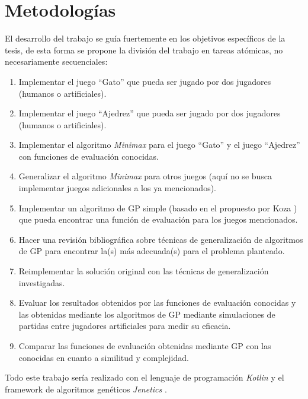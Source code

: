 \section{Metodologías}
  El desarrollo del trabajo se guía fuertemente en los objetivos específicos de la tesis, de esta 
  forma se propone la división del trabajo en tareas atómicas, no necesariamente secuenciales:

  \begin{enumerate}
    \item Implementar el juego \enquote{Gato} que pueda ser jugado por dos jugadores (humanos o 
      artificiales).
    \item Implementar el juego \enquote{Ajedrez} que pueda ser jugado por dos jugadores (humanos o 
      artificiales).
    \item Implementar el algoritmo \textit{Minimax} para el juego \enquote{Gato} y el juego 
      \enquote{Ajedrez} con funciones de evaluación conocidas.
    \item Generalizar el algoritmo \textit{Minimax} para otros juegos (aquí no se busca implementar
      juegos adicionales a los ya mencionados).
    \item Implementar un algoritmo de GP simple (basado en el propuesto por Koza 
      \cite{kozaGeneticProgrammingMeans1994a}) que pueda encontrar una función de evaluación para
      los juegos mencionados.
    \item Hacer una revisión bibliográfica sobre técnicas de generalización de algoritmos de GP para 
      encontrar la(s) más adecuada(s) para el problema planteado.
    \item Reimplementar la solución original con las técnicas de generalización investigadas.
    \item Evaluar los resultados obtenidos por las funciones de evaluación conocidas y las obtenidas 
      mediante los algoritmos de GP mediante simulaciones de partidas entre jugadores artificiales
      para medir su eficacia.
    \item Comparar las funciones de evaluación obtenidas mediante GP con las conocidas en cuanto a
      similitud y complejidad.
  \end{enumerate}

  Todo este trabajo sería realizado con el lenguaje de programación \textit{Kotlin} 
  \cite{KotlinProgrammingLanguage} y el framework de algoritmos genéticos \textit{Jenetics} 
  \cite{wilhelmstotterJeneticsJavaGenetic}.
